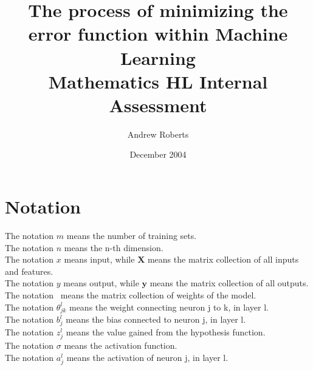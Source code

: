 \documentclass[a4paper,12pt]{article}
\begin{document}
\title{%
  The process of minimizing the error function within Machine Learning \\
  \small Mathematics HL Internal Assessment}
\author{Andrew Roberts}
\date{December 2004}
\maketitle
\pagebreak

\section{Notation}
The notation \(m\) means the number of training sets. \\
The notation \(n\) means the n-th dimension.  \\
The notation $x$ means input, while $\boldsymbol{X}$ means the matrix collection of all inputs and features. \\
The notation $y$ means output, while $\boldsymbol{y}$ means the matrix collection of all outputs. \\
The notation \boldmath{$\Theta$}\unboldmath \ means the matrix collection of weights of the model. \\
The notation $\theta_{jk}^l$ means the weight connecting neuron j to k, in layer l. \\
The notation $b_j^l$ means the bias connected to neuron j, in layer l. \\
The notation $z_j^l$ means the value gained from the hypothesis function. \\
The notation $\sigma$ means the activation function. \\
The notation $a^l_j$ means the activation of neuron j, in layer l. 
\end{document}
